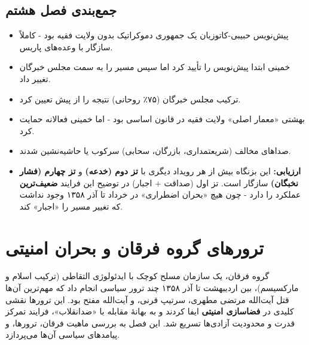 \documentclass[12pt,a4paper]{book}
\newcommand{\keyword}[1]{\textbf{\textcolor{cPrimary}{#1}}}
\begin{document}
\section{جمع‌بندی فصل هشتم}

\begin{principleBox}
\begin{itemize}[label=\textcolor{cPrimary}{$\blacksquare$}, rightmargin=2em]
    \item پیش‌نویس حبیبی-کاتوزیان یک جمهوری دموکراتیک بدون ولایت فقیه بود - کاملاً سازگار با وعده‌های پاریس.
    \item خمینی ابتدا پیش‌نویس را تأیید کرد اما سپس مسیر را به سمت مجلس خبرگان تغییر داد.
    \item ترکیب مجلس خبرگان (۷۵٪ روحانی) نتیجه را از پیش تعیین کرد.
    \item بهشتی «معمار اصلی» ولایت فقیه در قانون اساسی بود - اما خمینی فعالانه حمایت کرد.
    \item صداهای مخالف (شریعتمداری، بازرگان، سحابی) سرکوب یا حاشیه‌نشین شدند.
    \item \keyword{ارزیابی:} این بزنگاه بیش از هر رویداد دیگری با \keyword{تز دوم (خدعه)} و \keyword{تز چهارم (فشار نخبگان)} سازگار است. تز اول (صداقت + اجبار) در توضیح این فرایند \keyword{ضعیف‌ترین} عملکرد را دارد - چون هیچ «بحران اضطراری» در خرداد تا آذر ۱۳۵۸ وجود نداشت که تغییر مسیر را «اجبار» کند.
\end{itemize}
\end{principleBox}


\chapter{ترورهای گروه فرقان و بحران امنیتی}
\label{chap:b92475}


\begin{infoBox}
گروه فرقان، یک سازمان مسلح کوچک با ایدئولوژی التقاطی (ترکیب اسلام و مارکسیسم)، بین اردیبهشت تا آذر ۱۳۵۸ چند ترور سیاسی انجام داد که مهم‌ترین آن‌ها قتل آیت‌الله مرتضی مطهری، سرتیپ قرنی، و آیت‌الله مفتح بود. این ترورها نقشی کلیدی در \keyword{فضاسازی امنیتی} ایفا کردند و به بهانهٔ مقابله با «ضدانقلاب»، فرایند تمرکز قدرت و محدودیت آزادی‌ها تسریع شد. این فصل به بررسی ماهیت فرقان، ترورها، و پیامدهای سیاسی آن‌ها می‌پردازد.
\end{infoBox}
\end{document}
